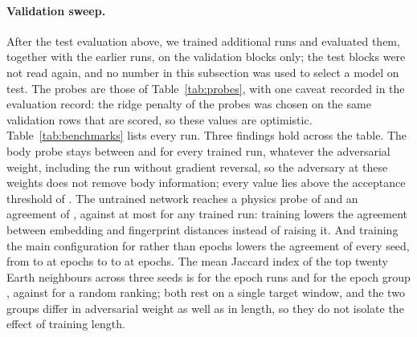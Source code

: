\paragraph{Validation sweep.} After the test evaluation above, we trained additional runs and
evaluated them, together with the earlier runs, on the validation blocks only; the test blocks were
not read again, and no number in this subsection was used to select a model on test. The probes are
those of Table~\ref{tab:probes}, with one caveat recorded in the evaluation record: the ridge
penalty of the probes was chosen on the same validation rows that are scored, so these values are
optimistic. Table~\ref{tab:benchmarks} lists every run. Three findings hold across the table. The
body probe stays between \ValFortyCBody{} and \ValLamZeroSBody{} for every trained run, whatever the
adversarial weight, including the run without gradient reversal, so the adversary at these weights
does not remove body information; every value lies above the acceptance threshold of
\GFiveBodyAccMax. The untrained network reaches a physics probe of \ValRandomSPhys{} and an agreement
of \ValRandomSRho, against at most \ValLamThreeSBRho{} for any trained run: training lowers the
agreement between embedding and fingerprint distances instead of raising it. And training the
main configuration for \ThruMpsFortyEpochs{} rather than \TrainEpochs{} epochs lowers the agreement
of every seed, from \ValLamThreeSCRho{} to \ValLamThreeSBRho{} at \TrainEpochs{} epochs to
\ValFortyCRho{} to \ValFortyARho{} at \ThruMpsFortyEpochs{} epochs. The mean Jaccard index of the
top twenty Earth neighbours across three seeds is \ValFortyJaccard{} for the
\ThruMpsFortyEpochs{} epoch runs and \ValSweepJaccard{} for the \TrainEpochs{} epoch group
\texttt{\ValSweepJaccardArm}, against \ValSweepRandomJaccard{} for a random ranking; both rest on a
single target window, and the two groups differ in adversarial weight as well as in length, so they
do not isolate the effect of training length.

